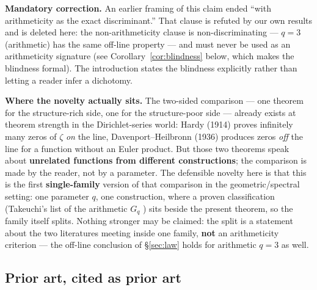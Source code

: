 \documentclass[11pt]{amsart}
\theoremstyle{remark}
\begin{document}
\textbf{Mandatory correction.} An earlier framing of this claim ended
``with arithmeticity as the exact discriminant.'' That clause is refuted
by our own results and is deleted here: the non-arithmeticity clause is
non-discriminating --- $q=3$ (arithmetic) has the same off-line property
--- and must never be used as an arithmeticity signature (see
Corollary~\ref{cor:blindness} below, which makes the blindness formal).
The introduction states the blindness explicitly rather than letting a
reader infer a dichotomy.

\textbf{Where the novelty actually sits.} The two-sided comparison ---
one theorem for the structure-rich side, one for the structure-poor side
--- already exists at theorem strength in the Dirichlet-series world:
Hardy (1914) \cite{Hardy1914} proves infinitely many zeros of $\zeta$ \emph{on} the line,
Davenport--Heilbronn (1936) produces zeros \emph{off} the line for a
function without an Euler product. But those two theorems speak about
\textbf{unrelated functions from different constructions}; the comparison
is made by the reader, not by a parameter. The defensible novelty here is
that this is the first \textbf{single-family} version of that comparison
in the geometric/spectral setting: one parameter $q$, one construction,
where a proven classification (Takeuchi's list of the arithmetic $G_q$ \cite{Takeuchi1977})
sits beside the present theorem, so the family itself splits. Nothing
stronger may be claimed: the split is a statement about the two
literatures meeting inside one family, \textbf{not} an arithmeticity
criterion --- the off-line conclusion of \S\ref{sec:law} holds for
arithmetic $q=3$ as well.

\subsection{Prior art, cited as prior art}
\end{document}
